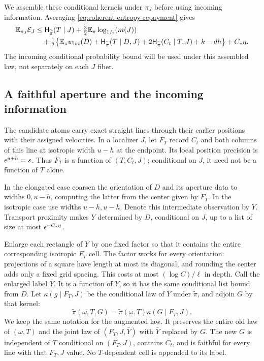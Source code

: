We assemble these conditional kernels under \(\pi_J\) before
using incoming information.  Averaging
\eqref{eq:coherent-entropy-repayment} gives
\begin{align}
 \mathbb E_{\pi_J}\mathcal E_J
 &\le \mathsf H_{\widetilde\pi}(T\mid J)
       +\tfrac32\mathbb E_\pi\log_{1/\epsilon}\!\left(m(J)\right)\notag\\
 &\quad+\tfrac12\bigl\{
       \mathbb E_\pi w_{\rm loc}(D)
       +\mathsf H_{\widetilde\pi}(T\mid D,J)
       +2\mathsf H_{\widetilde\pi}(C_t\mid T,J)
       +k-dh\bigr\}+C_*\eta .
 \label{eq:coherent-entropy-repayment-averaged}
\end{align}
The incoming conditional probability bound will be used under this
assembled law, not separately on each \(J\) fiber.

\subsection{A faithful aperture and the incoming information}

The candidate atoms carry exact straight lines through their earlier
positions with their assigned velocities.  In a localizer \(J\),
let \(F_T\) record \(C_t\) and both columns of this line at
isotropic width \(u-h\) at the endpoint.  Its local position
precision is \(\epsilon^{u+h}=s\).  Thus \(F_T\) is a function of
\((T,C_t,J)\); conditional on \(J\), it need not be a function
of \(T\) alone.

In the elongated case coarsen the orientation of \(D\) and its
aperture data to widths \(0,u-h\), computing the latter from the
center given by \(F_T\).  In the isotropic case use widths
\(u-h,u-h\).  Denote this intermediate observation by \(Y\).
Transport proximity makes \(Y\) determined by \(D\), conditional
on \(J\), up to a list of size at most \(\epsilon^{-C_*\eta}\).

Enlarge each rectangle of \(Y\) by one fixed factor so that it
contains the entire corresponding isotropic \(F_T\) cell.  The
factor works for every orientation: projections of a square have
length at most its diagonal, and rounding the center adds only a
fixed grid spacing.  This costs at most \((\log C)/\ell\) in depth.
Call the enlarged label \(\bar Y\).  It is a function of \(Y\),
so it has the same conditional list bound from \(D\).
Let \(\kappa(g\mid F_T,J)\) be the conditional law of \(\bar Y\)
under \(\widetilde\pi\), and adjoin \(G\) by that kernel:
\[
 \widetilde\pi(\omega,T,G)
   =\widetilde\pi(\omega,T)\kappa(G\mid F_T,J).
\]
We keep the same notation for the augmented law.  It preserves the
entire old law of \((\omega,T)\) and the joint law of
\((F_T,J,\bar Y)\) with \(\bar Y\) replaced by \(G\).
The new \(G\) is independent of \(T\) conditional on \((F_T,J)\),
contains \(C_t\), and is faithful for every line with that
\(F_T,J\) value.  No \(T\)-dependent cell is appended to its label.

